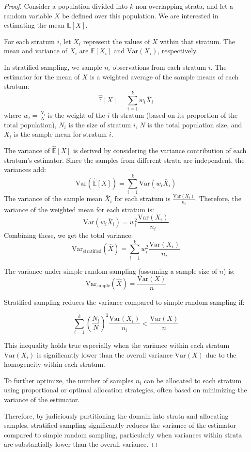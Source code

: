 \documentclass{report}
\begin{document}
\begin{proof}
    Consider a population divided into \( k \) non-overlapping strata, and let a random variable \( X \) be defined over this population. We are interested in estimating the mean \( \mathbb{E}[X] \).

	For each stratum \( i \), let \( X_i \) represent the values of \( X \) within that stratum. The mean and variance of \( X_i \) are \( \mathbb{E}[X_i] \) and \( \mathrm{Var}(X_i) \), respectively.

   	In stratified sampling, we sample \( n_i \) observations from each stratum \( i \). The estimator for the mean of \( X \) is a weighted average of the sample means of each stratum:
   	\[ \hat{\mathbb{E}}[X] = \sum_{i=1}^{k} w_i \bar{X}_i \]
   	where \( w_i = \frac{N_i}{N} \) is the weight of the \( i \)-th stratum (based on its proportion of the total population), \( N_i \) is the size of stratum \( i \), \( N \) is the total population size, and \( \bar{X}_i \) is the sample mean for stratum \( i \).

   	The variance of \( \hat{\mathbb{E}}[X] \) is derived by considering the variance contribution of each stratum's estimator. Since the samples from different strata are independent, the variances add:
   	\[ \mathrm{Var}(\hat{\mathbb{E}}[X]) = \sum_{i=1}^{k} \mathrm{Var}(w_i \bar{X}_i) \]
   	The variance of the sample mean \( \bar{X}_i \) for each stratum is \( \frac{\mathrm{Var}(X_i)}{n_i} \). Therefore, the variance of the weighted mean for each stratum is:
   	\[ \mathrm{Var}(w_i \bar{X}_i) = w_i^2 \frac{\mathrm{Var}(X_i)}{n_i} \]
   	Combining these, we get the total variance:
   	\[ \mathrm{Var}_{\text{stratified}}(\hat{X}) = \sum_{i=1}^{k} w_i^2 \frac{\mathrm{Var}(X_i)}{n_i} \]

   	The variance under simple random sampling (assuming a sample size of \( n \)) is:
   	\[ \mathrm{Var}_{\text{simple}}(\hat{X}) = \frac{\mathrm{Var}(X)}{n} \]

	Stratified sampling reduces the variance compared to simple random sampling if:

	\[ \sum_{i=1}^{k} \left( \frac{N_i}{N} \right)^2 \frac{\mathrm{Var}(X_i)}{n_i} < \frac{\mathrm{Var}(X)}{n} \]
	   
	This inequality holds true especially when the variance within each stratum \( \mathrm{Var}(X_i) \) is significantly lower than the overall variance \( \mathrm{Var}(X) \) due to the homogeneity within each stratum.
	   
	To further optimize, the number of samples \( n_i \) can be allocated to each stratum using proportional or optimal allocation strategies, often based on minimizing the variance of the estimator.
	   
	Therefore, by judiciously partitioning the domain into strata and allocating samples, stratified sampling significantly reduces the variance of the estimator compared to simple random sampling, particularly when variances within strata are substantially lower than the overall variance.

\end{proof}
\end{document}
